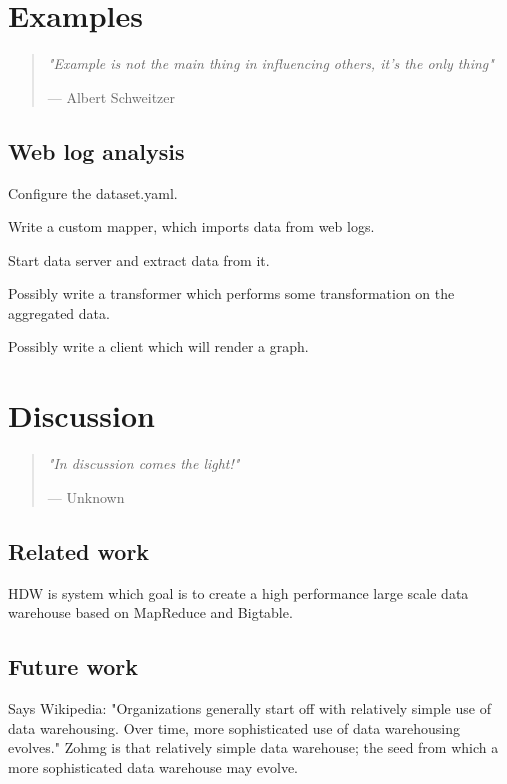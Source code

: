 \documentclass[a4paper,10pt]{book}
\newcommand{\chapterquote}[2] {
\begin{quote}
\textit{"{#1}"}

--- {#2}
\end{quote}

\vspace{24pt}
}
\begin{document}
\chapter{Examples}

\chapterquote{Example is not the main thing in influencing others, it's
the only thing}{Albert Schweitzer}




\section{Web log analysis}

Configure the dataset.yaml.

Write a custom mapper, which imports data from web logs.

Start data server and extract data from it.

Possibly write a transformer which performs some transformation on the
aggregated data.

Possibly write a client which will render a graph.



\chapter{Discussion}

\chapterquote{In discussion comes the light!}{Unknown}

\section{Related work}

HDW is system which goal is to create a high performance large scale data
warehouse based on MapReduce and Bigtable. \cite{hdw}



\section{Future work}

Says Wikipedia: "Organizations generally start off with relatively simple use of data warehousing. Over time, more sophisticated use of data warehousing evolves." Zohmg is that relatively simple data warehouse; the seed from which a more sophisticated data warehouse may evolve.
\end{document}
